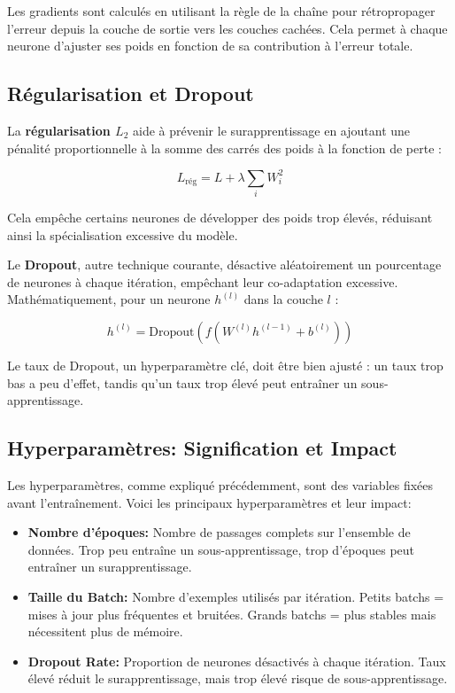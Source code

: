 Les gradients sont calculés en utilisant la règle de la chaîne pour rétropropager l'erreur depuis la couche de sortie vers les couches cachées. Cela permet à chaque neurone d'ajuster ses poids en fonction de sa contribution à l'erreur totale.

\subsection{Régularisation et Dropout}

La \textbf{régularisation \( L_2 \)} aide à prévenir le surapprentissage en ajoutant une pénalité proportionnelle à la somme des carrés des poids à la fonction de perte :

\[ 
L_{\text{rég}} = L + \lambda \sum_{i} W_i^2 
\]

Cela empêche certains neurones de développer des poids trop élevés, réduisant ainsi la spécialisation excessive du modèle.

Le \textbf{Dropout}, autre technique courante, désactive aléatoirement un pourcentage de neurones à chaque itération, empêchant leur co-adaptation excessive. Mathématiquement, pour un neurone \( h^{(l)} \) dans la couche \( l \) :

\[
h^{(l)} = \text{Dropout}(f(W^{(l)} h^{(l-1)} + b^{(l)}))
\]

Le taux de Dropout, un hyperparamètre clé, doit être bien ajusté : un taux trop bas a peu d'effet, tandis qu'un taux trop élevé peut entraîner un sous-apprentissage.

\subsection{Hyperparamètres: Signification et Impact}
Les hyperparamètres, comme expliqué précédemment, sont des variables fixées avant l'entraînement. Voici les principaux hyperparamètres et leur impact:
\begin{itemize}
\item \textbf{Nombre d'époques:} Nombre de passages complets sur l'ensemble de données. Trop peu entraîne un sous-apprentissage, trop d'époques peut entraîner un surapprentissage.

\item \textbf{Taille du Batch:} Nombre d'exemples utilisés par itération. Petits batchs = mises à jour plus fréquentes et bruitées. Grands batchs = plus stables mais nécessitent plus de mémoire.

\item \textbf{Dropout Rate:} Proportion de neurones désactivés à chaque itération. Taux élevé réduit le surapprentissage, mais trop élevé risque de sous-apprentissage.

\end{itemize}

